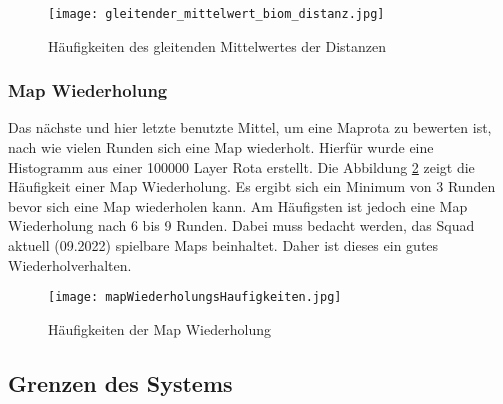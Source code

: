            \begin{figure}[h]
                \centering
                \texttt{[image: gleitender\_mittelwert\_biom\_distanz.jpg]}
                \caption{Häufigkeiten des gleitenden Mittelwertes der Distanzen}
                \label{fig:haufigkeit_gleitender_mittelwert}
            \end{figure}
            

        \subsubsection{Map Wiederholung}
            Das nächste und hier letzte benutzte Mittel, um eine Maprota zu bewerten ist, nach wie vielen Runden sich eine Map
            wiederholt. Hierfür wurde eine Histogramm aus einer 100000 Layer Rota erstellt.
            Die Abbildung \ref{fig:haufigkeit_der_map_wiederholung} zeigt die Häufigkeit einer Map Wiederholung. Es ergibt sich ein
            Minimum von 3 Runden bevor sich eine Map wiederholen kann. Am Häufigsten ist jedoch eine Map Wiederholung nach 6 bis 9 Runden.
            Dabei muss bedacht werden, das Squad aktuell (09.2022) spielbare Maps beinhaltet. Daher ist dieses ein gutes Wiederholverhalten.

            \begin{figure}[h]
                \centering
                \texttt{[image: mapWiederholungsHaufigkeiten.jpg]}
                \caption{Häufigkeiten der Map Wiederholung}
                \label{fig:haufigkeit_der_map_wiederholung}
            \end{figure}

    \subsection{Grenzen des Systems}
        \label{s:grenzen_des_systems}
